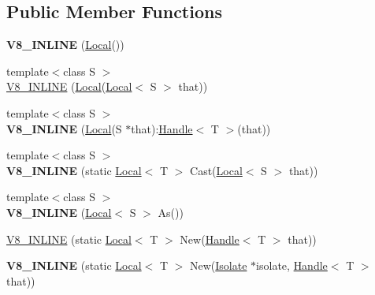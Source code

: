 \subsection*{Public Member Functions}
\begin{DoxyCompactItemize}
\item 
\hypertarget{classv8_1_1_local_acd71c6a66f5114d76b3a3c02a16547c1}{}{\bfseries V8\+\_\+\+I\+N\+L\+I\+N\+E} (\hyperlink{classv8_1_1_local}{Local}())\label{classv8_1_1_local_acd71c6a66f5114d76b3a3c02a16547c1}

\item 
{\footnotesize template$<$class S $>$ }\\\hyperlink{classv8_1_1_local_a5f4598866402a6a896e2bf5863a3ab4c}{V8\+\_\+\+I\+N\+L\+I\+N\+E} (\hyperlink{classv8_1_1_local}{Local}(\hyperlink{classv8_1_1_local}{Local}$<$ S $>$ that))
\item 
\hypertarget{classv8_1_1_local_a33fde5f107f7820eaae0e4368c6686f1}{}{\footnotesize template$<$class S $>$ }\\{\bfseries V8\+\_\+\+I\+N\+L\+I\+N\+E} (\hyperlink{classv8_1_1_local}{Local}(S $\ast$that)\+:\hyperlink{classv8_1_1_handle}{Handle}$<$ T $>$(that))\label{classv8_1_1_local_a33fde5f107f7820eaae0e4368c6686f1}

\item 
\hypertarget{classv8_1_1_local_a3ddee57e5675b4b1404f26427d23dcd0}{}{\footnotesize template$<$class S $>$ }\\{\bfseries V8\+\_\+\+I\+N\+L\+I\+N\+E} (static \hyperlink{classv8_1_1_local}{Local}$<$ T $>$ Cast(\hyperlink{classv8_1_1_local}{Local}$<$ S $>$ that))\label{classv8_1_1_local_a3ddee57e5675b4b1404f26427d23dcd0}

\item 
\hypertarget{classv8_1_1_local_a08ed8f55acad5cd41566be97cae027d9}{}{\footnotesize template$<$class S $>$ }\\{\bfseries V8\+\_\+\+I\+N\+L\+I\+N\+E} (\hyperlink{classv8_1_1_local}{Local}$<$ S $>$ As())\label{classv8_1_1_local_a08ed8f55acad5cd41566be97cae027d9}

\item 
\hyperlink{classv8_1_1_local_a4bcce5962fa2f2b9131a110f79350e7c}{V8\+\_\+\+I\+N\+L\+I\+N\+E} (static \hyperlink{classv8_1_1_local}{Local}$<$ T $>$ New(\hyperlink{classv8_1_1_handle}{Handle}$<$ T $>$ that))
\item 
\hypertarget{classv8_1_1_local_a8b0ac03c4da07a94a9cb91620a0062d9}{}{\bfseries V8\+\_\+\+I\+N\+L\+I\+N\+E} (static \hyperlink{classv8_1_1_local}{Local}$<$ T $>$ New(\hyperlink{classv8_1_1_isolate}{Isolate} $\ast$isolate, \hyperlink{classv8_1_1_handle}{Handle}$<$ T $>$ that))\label{classv8_1_1_local_a8b0ac03c4da07a94a9cb91620a0062d9}

\end{DoxyCompactItemize}
